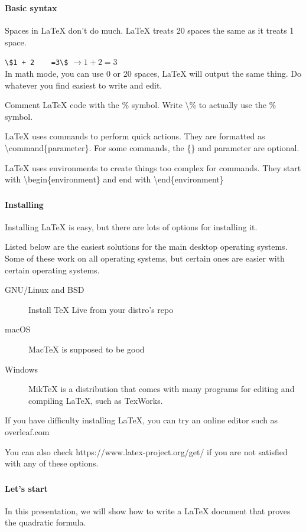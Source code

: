 \documentclass{beamer}
\begin{document}
	\begin{frame}
		\frametitle{\secname}
		\framesubtitle{Basic syntax}
		\begin{description}[<+->]
			\item[Spacing] Spaces in \LaTeX{} don't do much. \LaTeX{} treats 20 spaces the same as it treats 1 space.
			\item[Inline math] \lstinline{\$1 + 2    =3\$} $\rightarrow 1 + 2 = 3$\\ In math mode, you can use 0 or 20 spaces, \LaTeX{} will output the same thing. Do whatever you find easiest to write and edit.
			\item[Comments] Comment \LaTeX{} code with the \% symbol. Write \textbackslash\% to actually use the \% symbol.
			\item[Commands] \LaTeX{} uses commands to perform quick actions. They are formatted as \textbackslash command\{parameter\}. For some commands, the \{\} and parameter are optional.
			\item[Environments] \LaTeX{} uses environments to create things too complex for commands. They start with \textbackslash begin\{environment\} and end with \textbackslash end\{environment\}
		\end{description}
	\end{frame}
	\begin{frame}
		\frametitle{\secname}
		\framesubtitle{Installing}
		Installing \LaTeX{} is easy, but there are lots of options for installing it.
		
		Listed below are the easiest solutions for the main desktop operating systems. Some of these work on all operating systems, but certain ones are easier with certain operating systems.
		\begin{description}
			\item[GNU/Linux and BSD] Install \TeX{} Live from your distro's repo
			\item[macOS] Mac\TeX{} is supposed to be good
			\item[Windows] MikTeX is a distribution that comes with many programs for editing and compiling \LaTeX{}, such as TexWorks.
		\end{description}
		If you have difficulty installing \LaTeX{}, you can try an online editor such as overleaf.com

		You can also check https://www.latex-project.org/get/ if you are not satisfied with any of these options.
	\end{frame}
	\begin{frame}
		\frametitle{\secname}
		\framesubtitle{Let's start}
		In this presentation, we will show how to write a \LaTeX{} document that proves the quadratic formula.
	\end{frame}
\end{document}
